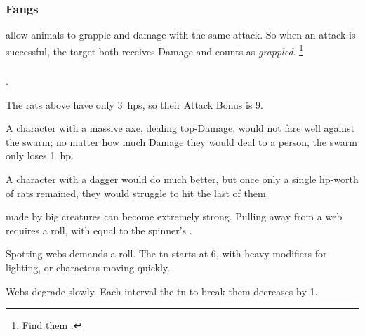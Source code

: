 \begin{multicols}{2}
\subsubsection{Fangs}
\label{teeth}
\label{fangs}
allow animals to grapple and damage with the same attack.
So when an attack is successful, the target both receives Damage and counts as \textit{grappled}.%
\footnote{Find them .}

\subsubsection{}
.


\begin{exampletext}
  The rats above have only 3~\glspl{hp}, so their Attack Bonus is 9.

  A character with a massive axe, dealing top-Damage, would not fare well against the swarm; no matter how much Damage they would deal to a person, the swarm only loses 1~\gls{hp}.

  A character with a dagger would do much better, but once only a single \gls{hp}-worth of rats remained, they would struggle to hit the last of them.
\end{exampletext}

made by big creatures can become extremely strong.
Pulling away from a web requires a  roll, with  equal to the spinner's .

Spotting webs demands a  roll.
The \gls{tn} starts at 6, with heavy modifiers for lighting, or characters moving quickly.

Webs degrade slowly.
Each \gls{interval} the \gls{tn} to break them decreases by 1.


\end{multicols}
